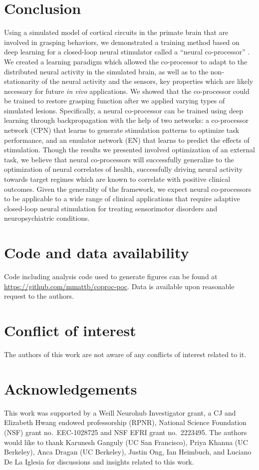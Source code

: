 \documentclass[12pt]{iopart}
\begin{document}
\section{Conclusion}
Using a simulated model of cortical circuits in the primate brain that are involved in grasping
behaviors, we demonstrated a training method based on deep learning for a closed-loop neural
stimulator called a ``neural co-processor'' \cite{rao.coproc,rao.braincoproc}. We created a
learning paradigm which allowed the co-processor to adapt to the distributed neural activity
in the simulated brain, as well as to the non-stationarity of the neural activity and the 
sensors, key properties which are likely necessary for future \textit{in vivo} applications.
We showed that the co-processor could be trained to restore grasping function after we applied
varying types of simulated lesions. Specifically, a neural co-processor can be trained using
deep learning through backpropagation with the help of two networks: a co-processor
network (CPN) that learns to generate stimulation patterns to optimize task performance, and an
emulator network (EN) that learns to predict the effects of stimulation. Though the results we presented 
involved optimization of an external task, we believe that neural co-processors will successfully
generalize to the optimization of neural correlates of health, successfully driving neural activity
towards target regimes which are known to correlate with positive clinical outcomes. Given the generality
of the framework, we expect neural co-processors to be applicable to a wide range of clinical applications
that require adaptive closed-loop neural stimulation for treating sensorimotor disorders and
neuropsychiatric conditions. 

\section*{Code and data availability}
Code including analysis code used to
generate figures can be found at
\url{https://github.com/mmattb/coproc-poc}.
Data is available upon reasonable request to the authors.

\section*{Conflict of interest}
The authors of this work are not aware of any conflicts of interest
related to it.

\section*{Acknowledgements}
This work was supported by a Weill Neurohub Investigator grant, a CJ and Elizabeth Hwang
endowed professorship (RPNR), National Science Foundation (NSF) grant no.\ EEC-1028725 and NSF EFRI
grant no.\ 2223495. The authors would like to thank Karunesh Ganguly (UC San Francisco), Priya Khanna
(UC Berkeley), Anca Dragan (UC Berkeley), Justin Ong, Ian Heimbuch, and Luciano De La Iglesia for
discussions and insights related to this work.
\end{document}
